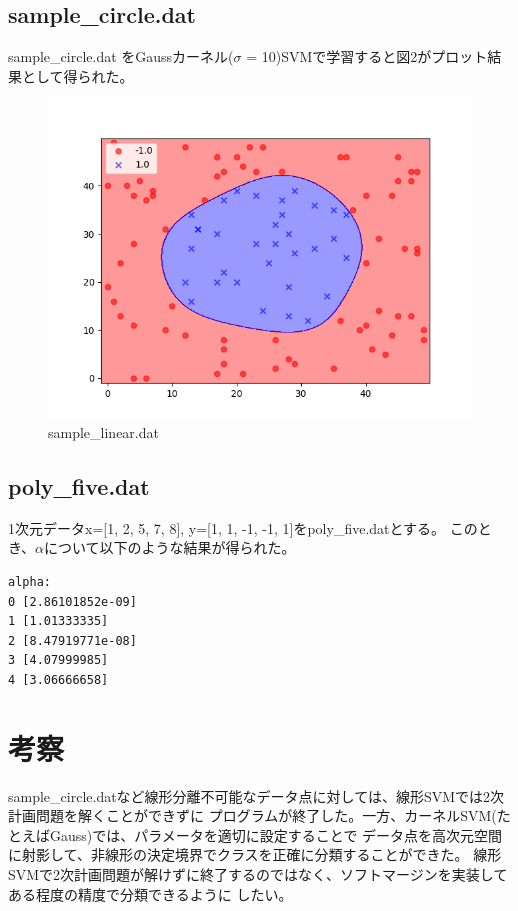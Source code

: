 \documentclass{jsarticle}
\begin{document}
\subsection{sample\_circle.dat}
sample\_circle.dat をGaussカーネル($\sigma$ = 10)SVMで学習すると図2がプロット結果として得られた。
\begin{figure}[!h]
\centering \includegraphics[width=15cm]{sample_circle.png}
\caption{sample\_linear.dat}
\end{figure}

\subsection{poly\_five.dat}
1次元データx=[1, 2, 5, 7, 8], y=[1, 1, -1, -1, 1]をpoly\_five.datとする。
このとき、$\alpha$について以下のような結果が得られた。
\begin{lstlisting}
alpha: 
0 [2.86101852e-09]
1 [1.01333335]
2 [8.47919771e-08]
3 [4.07999985]
4 [3.06666658]
\end{lstlisting}

\section{考察}
sample\_circle.datなど線形分離不可能なデータ点に対しては、線形SVMでは2次計画問題を解くことができずに
プログラムが終了した。一方、カーネルSVM(たとえばGauss)では、パラメータを適切に設定することで
データ点を高次元空間に射影して、非線形の決定境界でクラスを正確に分類することができた。
線形SVMで2次計画問題が解けずに終了するのではなく、ソフトマージンを実装してある程度の精度で分類できるように
したい。
\end{document}
